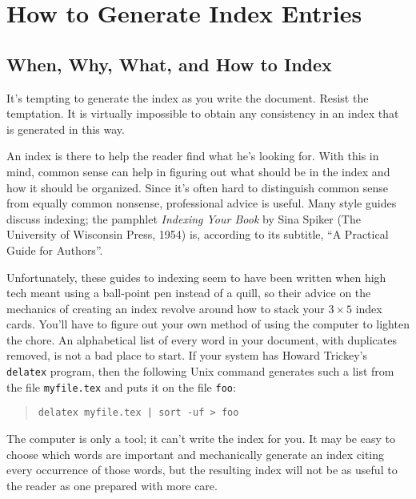 \section{How to Generate Index Entries}

\subsection{When, Why, What, and How to Index}

It's tempting to generate the index as you write the document.  Resist
the temptation.  It is virtually impossible to obtain any consistency
in an index that is  generated in this way.

An index is there to help the reader find what he's looking for.  With
this in mind, common sense can help in figuring out what should be in
the index and how it should be organized.  Since it's often hard to
distinguish common sense from equally common nonsense, professional
advice%
is useful.  Many style guides discuss indexing; the pamphlet
{\em Indexing Your Book\/} by Sina Spiker%
(The University of Wisconsin%
Press, 1954) is, according to its subtitle, ``A Practical
Guide for Authors''.%

Unfortunately, these guides to indexing seem to have been written when
high tech meant using a ball-point pen%
instead of a quill,%
so their
advice on the mechanics of creating an index revolve around how to
stack your $3\times 5$ index cards.%
You'll have to figure out your own
method of using the computer to lighten the chore.  An alphabetical
list of every word%
in your document, with duplicates removed, is not a
bad place to start.  If your system has Howard Trickey's
{\tt delatex}%
program, then the following Unix command generates such a list from the
file {\tt myfile.tex} and puts it on the file {\tt foo}:
\begin{quote}
\tt delatex myfile.tex | sort -uf > foo
\end{quote}

The computer is only a tool; it can't write the index for you.  It may
be easy to choose which words are important and mechanically generate
an index citing every occurrence of those words, but the resulting
index will not be as useful to the reader as one prepared with more
care.





